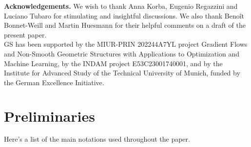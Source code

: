 \documentclass[10pt,leqno]{amsart}
\numberwithin{equation}{section}
\begin{document}
\bigskip

\noindent\textbf{Acknowledgements.} We wish to thank Anna Korba, Eugenio Regazzini and Luciano Tubaro
for stimulating and insightful discussions. We also thank Beno\^it Bonnet-Weill and Martin Huesmann for their helpful comments on a draft of the present paper. 
\\
GS has been supported by the MIUR-PRIN 202244A7YL project Gradient Flows and Non-Smooth
Geometric Structures with Applications to Optimization and Machine Learning, by the INDAM project
E53C23001740001, and by the Institute for Advanced Study of the Technical University of Munich, funded
by the German Excellence Initiative.



\section{Preliminaries}\label{preliminary section}

\noindent Here's a list of the main notations used throughout the paper.
\end{document}
